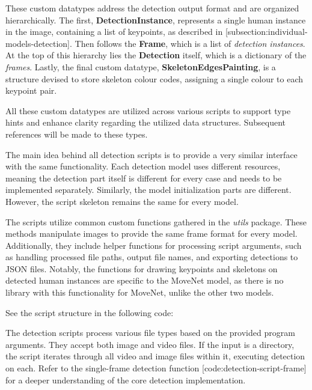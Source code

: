 
These custom datatypes address the detection output format and are organized hierarchically. The first, {\bf DetectionInstance}, represents a single human instance in the image, containing a list of keypoints, as described in [subsection:individual-models-detection]. Then follows the {\bf Frame}, which is a list of {\em detection instances}. At the top of this hierarchy lies the {\bf Detection} itself, which is a dictionary of the {\em frames}. Lastly, the final custom datatype, {\bf SkeletonEdgesPainting}, is a structure devised to store skeleton colour codes, assigning a single colour to each keypoint pair.

All these custom datatypes are utilized across various scripts to support type hints and enhance clarity regarding the utilized data structures. Subsequent references will be made to these types.

The main idea behind all detection scripts is to provide a very similar interface with the same functionality. Each detection model uses different resources, meaning the detection part itself is different for every case and needs to be implemented separately. Similarly, the model initialization parts are different. However, the script skeleton remains the same for every model.

The scripts utilize common custom functions gathered in the {\em utils} package. These methods manipulate images to provide the same frame format for every model. Additionally, they include helper functions for processing script arguments, such as handling processed file paths, output file names, and exporting detections to JSON files. Notably, the functions for drawing keypoints and skeletons on detected human instances are specific to the MoveNet model, as there is no library with this functionality for MoveNet, unlike the other two models.

See the script structure in the following code:


The detection scripts process various file types based on the provided program arguments. They accept both image and video files. If the input is a directory, the script iterates through all video and image files within it, executing detection on each. Refer to the single-frame detection function [code:detection-script-frame] for a deeper understanding of the core detection implementation.

